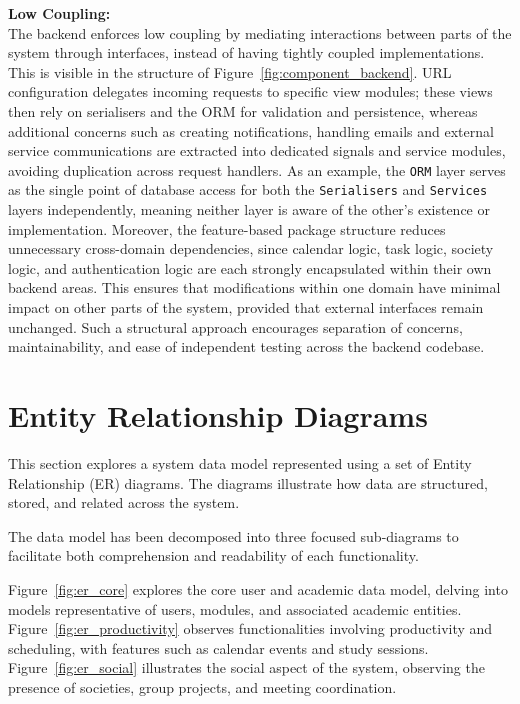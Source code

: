 \textbf{Low Coupling:} \\
The backend enforces low coupling by mediating interactions between parts of the system through interfaces, instead of having tightly coupled implementations. This is visible in the structure of Figure~\ref{fig:component_backend}. URL configuration
delegates incoming requests to specific view modules; these views then rely on serialisers and the ORM for validation and persistence, whereas additional concerns such as creating notifications, handling emails and external service communications are extracted into dedicated signals and service modules, avoiding duplication across request handlers.
As an example, the \texttt{ORM} layer serves as the single point of database access for both
the \texttt{Serialisers} and \texttt{Services} layers independently, meaning neither
layer is aware of the other's existence or implementation. Moreover, the feature-based
package structure reduces unnecessary cross-domain dependencies, since calendar logic,
task logic, society logic, and authentication logic are each strongly encapsulated within their own backend areas. This ensures that modifications within one domain have minimal impact on other parts of the system, provided that external interfaces remain unchanged. Such a structural approach encourages separation of concerns, maintainability, and ease of independent testing across the backend codebase.

\clearpage

\section{Entity Relationship Diagrams}

This section explores a system data model represented using a set of Entity Relationship (ER) diagrams. The diagrams illustrate how data are structured, stored, and related across the system.

The data model has been decomposed into three focused sub-diagrams to facilitate both comprehension and readability of each functionality.

Figure~\ref{fig:er_core} explores the core user and academic data model, delving into models representative of users, modules, and associated academic entities. Figure~\ref{fig:er_productivity} observes functionalities involving productivity and scheduling, with features such as calendar events and study sessions. Figure~\ref{fig:er_social} illustrates the social aspect of the system, observing the presence of societies, group projects, and meeting coordination.

